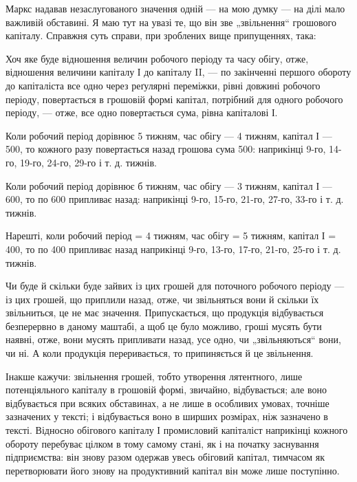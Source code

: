\parcont{}  %
Маркс надавав незаслугованого значення одній — на мою думку — на ділі
мало важливій обставині. Я маю тут на увазі те, що він зве „звільнення“
грошового капіталу. Справжня суть справи, при зроблених вище припущеннях,
така:

Хоч яке буде відношення величин робочого періоду та часу обігу,
отже, відношення величини капіталу І до капіталу II, — по закінченні першого
обороту до капіталіста все одно через реґулярні переміжки, рівні
довжині робочого періоду, повертається в грошовій формі капітал, потрібний
для одного робочого періоду, — отже, все одно повертається сума,
рівна капіталові І.

Коли робочий період дорівнює 5 тижням, час обігу — 4 тижням, капітал
І — 500, то кожного разу повертається назад грошова
сума 500: наприкінці 9-го, 14-го, 19-го, 24-го, 29-го і т. д.
тижнів.

Коли робочий період дорівнює б тижням, час обігу — 3 тижням, капітал
І — 600, то по 600 припливає назад: наприкінці
9-го, 15-го, 21-го, 27-го, 33-го і т. д. тижнів.

Нарешті, коли робочий період = 4 тижням, час обігу = 5 тижням,
капітал І = 400, то по 400 припливає назад наприкінці
9-го, 13-го, 17-го, 21-го, 25-го і т. д. тижнів.

Чи буде й скільки буде зайвих із цих грошей для поточного робочого
періоду — із цих грошей, що приплили назад, отже, чи звільняться
вони й скільки їх звільниться, це не має значення. Припускається, що
продукція відбувається безперервно в даному маштабі, а щоб це було
можливо, гроші мусять бути наявні, отже, вони мусять припливати назад,
усе одно, чи „звільняються“ вони, чи ні. А коли продукція переривається,
то припиняється й це звільнення.

Інакше кажучи: звільнення грошей, тобто утворення лятентного, лише
потенціяльного капіталу в грошовій формі, звичайно, відбувається;
але воно відбувається при всяких обставинах, а не лише в особливих умовах,
точніше зазначених у тексті; і відбувається воно в ширших розмірах,
ніж зазначено в тексті. Відносно обігового капіталу І промисловий капіталіст
наприкінці кожного обороту перебуває цілком в тому самому
стані, як і на початку заснування підприємства: він знову разом одержав
увесь обіговий капітал, тимчасом як перетворювати його знову на продуктивний
капітал він може лише поступінно.

